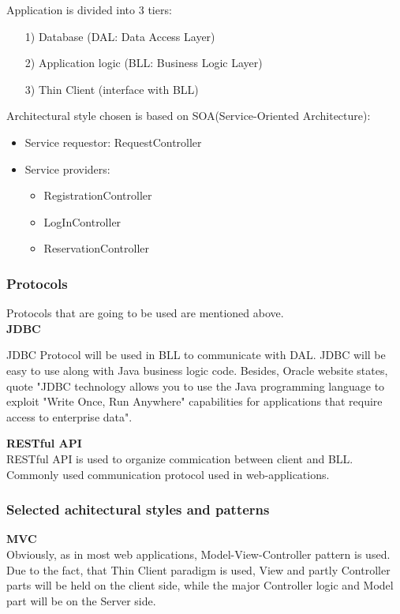 \documentclass[12pt, letterpaper]{article}
\begin{document}
Application is divided into 3 tiers:
\begin{itemize}
	\item [1)] Database (DAL: Data Access Layer)
	\item [2)] Application logic (BLL: Business Logic Layer)
	\item [3)] Thin Client (interface with BLL)
\end{itemize}

Architectural style chosen is based on SOA(Service-Oriented Architecture):
\begin{itemize}
	\item Service requestor: RequestController
	\item Service providers:
	\begin{itemize}
		\item RegistrationController
		\item LogInController
		\item ReservationController
	\end{itemize}
\end{itemize}

\subsubsection{Protocols}

Protocols that are going to be used are mentioned above. \\

\vspace{0.5cm}
\textbf{JDBC} \\
\vspace{0.5cm}

JDBC Protocol will be used in BLL to communicate with DAL. JDBC will be easy to use along with Java business logic code. Besides, Oracle website states, quote "JDBC technology allows you to use the Java programming language to exploit "Write Once, Run Anywhere" capabilities for applications that require access to enterprise data".

\vspace{0.5cm}
\textbf{RESTful API} \\
\vspace{0.5cm}
RESTful API is used to organize commication between client and BLL. \\
Commonly used communication protocol used in web-applications.

\subsubsection{Selected achitectural styles and patterns}
\vspace{0.5cm}
\textbf{MVC} \\
Obviously, as in most web applications, Model-View-Controller pattern is used. 
Due to the fact, that Thin Client paradigm is used, View and partly Controller parts will be held on the client side, while the major Controller logic and Model part will be on the Server side.    
\end{document}
